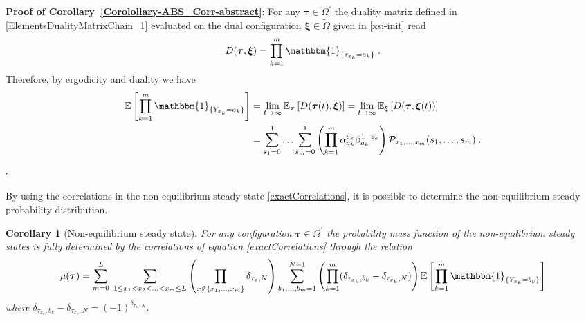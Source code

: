 \documentclass[10pt]{article}
\numberwithin{equation}{section}
\numberwithin{equation}{subsection}
\newtheorem{corollary}{Corollary}
\newcommand{\dt}{\;.}
\begin{document}
\textbf{Proof of Corollary~\ref{Corolollary-ABS_Corr-abstract}}:
For any $\bm{\tau}\in \Omega^{'}$ the duality matrix defined in \eqref{ElementsDualityMatrixChain_1} evaluated on the dual configuration $\bm{\xi}\in\widetilde{\Omega}$ given in \eqref{xsi-init} read
\begin{equation}
	D(\bm{\tau},\bm{\xi})
	=\prod_{k=1}^{m}\mathbbm{1}_{\{\tau_{x_{k}}=a_{k}\}}\dt
\end{equation}
Therefore, by ergodicity and duality  we have 
\begin{equation}\label{CorrelationByABS-prob}
	\begin{split}
\mathbb{E}\left[\prod_{k=1}^{m}\mathbbm{1}_{\{Y_{x_{k}}=a_{k}\}}\right]&=\lim_{t\to \infty}\mathbb{E}_{\bm{\tau}}\left[D(\bm{\tau}(t),\bm{{\xi}})\right]=\lim_{t\to \infty}\mathbb{E}_{\bm{\xi}}\left[D(\bm{\tau},\bm{{\xi}}(t))\right]
	\\&=\sum_{s_{1}=0}^{1}\ldots \sum_{s_{m}=0}^{1}\left(\prod_{k=1}^{m}\alpha_{a_{k}}^{s_{k}}\beta_{a_{k}}^{1-s_{k}}\right)\mathcal{P}_{x_{1},\ldots,x_{m}}(s_{1},\ldots,s_{m})\dt
\end{split}
\end{equation} 
\begin{flushright}
	$\square$
\end{flushright} 
{By using the correlations in the non-equilibrium steady state \eqref{exactCorrelations}, it is possible to determine the non-equilibrium steady probability distribution. }
    \begin{corollary}[Non-equilibrium steady state]\label{Corollary-NESS-ABS}
For any configuration $\bm{\tau}\in \Omega^{'}$  the probability mass function of the non-equilibrium steady states is fully determined by the correlations of equation \eqref{exactCorrelations} through the relation 
{
\begin{equation}\label{implicit-mass-function}
	\mu(\bm{\tau})=
	\sum_{m=0}^{L}\;\sum_{1\leq x_{1}<x_{2}<\ldots<x_{m}\leq L}\left(\prod_{x\notin\{x_{1},\ldots,x_{m}\}}\delta_{\tau_{x},N}\right)\sum_{b_{1},\ldots,b_{m}=1}^{N-1}\left(\prod_{k=1}^{m}(\delta_{\tau_{x_{k}},b_{k}}-\delta_{\tau_{x_{k}},N})\right)\mathbb{E}\left[\prod_{k=1}^{m}\mathbbm{1}_{\{Y_{x_{k}}=b_{k}\}}\right]
\end{equation}
where $\delta_{\tau_{x_{k}},b_{k}}-\delta_{\tau_{x_{k}},N}=(-1)^{\delta_{\tau_{x_{k}},N}}$.
}
\end{corollary}
\end{document}
